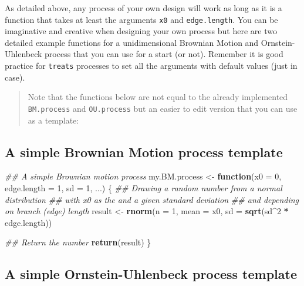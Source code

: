 \documentclass[
]{book}
\newenvironment{Shaded}{\begin{snugshade}}{\end{snugshade}}
\newcommand{\CommentTok}[1]{\textcolor[rgb]{0.56,0.35,0.01}{\textit{#1}}}
\newcommand{\ControlFlowTok}[1]{\textcolor[rgb]{0.13,0.29,0.53}{\textbf{#1}}}
\newcommand{\DataTypeTok}[1]{\textcolor[rgb]{0.13,0.29,0.53}{#1}}
\newcommand{\DecValTok}[1]{\textcolor[rgb]{0.00,0.00,0.81}{#1}}
\newcommand{\KeywordTok}[1]{\textcolor[rgb]{0.13,0.29,0.53}{\textbf{#1}}}
\newcommand{\NormalTok}[1]{#1}
\newcommand{\OperatorTok}[1]{\textcolor[rgb]{0.81,0.36,0.00}{\textbf{#1}}}
\newcommand{\StringTok}[1]{\textcolor[rgb]{0.31,0.60,0.02}{#1}}
\begin{document}
As detailed above, any process of your own design will work as long as it is a function that takes at least the arguments \texttt{x0} and \texttt{edge.length}.
You can be imaginative and creative when designing your own process but here are two detailed example functions for a unidimensional Brownian Motion and Ornstein-Uhlenbeck process that you can use for a start (or not).
Remember it is good practice for \texttt{treats} processes to set all the arguments with default values (just in case).

\begin{quote}
Note that the functions below are not equal to the already implemented \texttt{BM.process} and \texttt{OU.process} but an easier to edit version that you can use as a template:
\end{quote}

\hypertarget{a-simple-brownian-motion-process-template}{%
\subsection{A simple Brownian Motion process template}\label{a-simple-brownian-motion-process-template}}

\begin{Shaded}
\begin{Highlighting}[]
\CommentTok{\#\# A simple Brownian motion process}
\NormalTok{my.BM.process \textless{}{-}}\StringTok{ }\ControlFlowTok{function}\NormalTok{(}\DataTypeTok{x0 =} \DecValTok{0}\NormalTok{, }\DataTypeTok{edge.length =} \DecValTok{1}\NormalTok{, }\DataTypeTok{sd =} \DecValTok{1}\NormalTok{, ...) \{}
    \CommentTok{\#\# Drawing a random number from a normal distribution}
    \CommentTok{\#\# with x0 as the and a given standard deviation}
    \CommentTok{\#\# and depending on branch (edge) length}
\NormalTok{    result \textless{}{-}}\StringTok{ }\KeywordTok{rnorm}\NormalTok{(}\DataTypeTok{n =} \DecValTok{1}\NormalTok{, }\DataTypeTok{mean =}\NormalTok{ x0, }\DataTypeTok{sd =} \KeywordTok{sqrt}\NormalTok{(sd}\OperatorTok{\^{}}\DecValTok{2} \OperatorTok{*}\StringTok{ }\NormalTok{edge.length))}

    \CommentTok{\#\# Return the number}
    \KeywordTok{return}\NormalTok{(result)}
\NormalTok{\}}
\end{Highlighting}
\end{Shaded}

\hypertarget{a-simple-ornstein-uhlenbeck-process-template}{%
\subsection{A simple Ornstein-Uhlenbeck process template}\label{a-simple-ornstein-uhlenbeck-process-template}}
\end{document}
